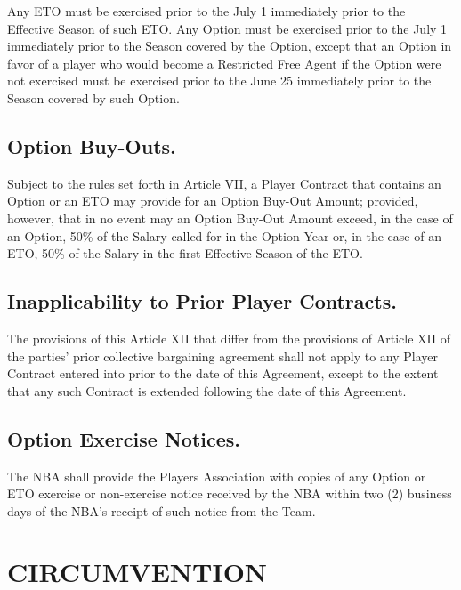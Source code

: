 \documentclass[
]{book}
\begin{document}
Any ETO must be exercised prior to the July 1 immediately prior to the Effective Season of such ETO. Any Option must be exercised prior to the July 1 immediately prior to the Season covered by the Option, except that an Option in favor of a player who would become a Restricted Free Agent if the Option were not exercised must be exercised prior to the June 25 immediately prior to the Season covered by such Option.

\hypertarget{option-buy-outs.}{%
\section{Option Buy-Outs.}\label{option-buy-outs.}}

Subject to the rules set forth in Article VII, a Player Contract that contains an Option or an ETO may provide for an Option Buy-Out Amount; provided, however, that in no event may an Option Buy-Out Amount exceed, in the case of an Option, 50\% of the Salary called for in the Option Year or, in the case of an ETO, 50\% of the Salary in the first Effective Season of the ETO.

\hypertarget{inapplicability-to-prior-player-contracts.}{%
\section{Inapplicability to Prior Player Contracts.}\label{inapplicability-to-prior-player-contracts.}}

The provisions of this Article XII that differ from the provisions of Article XII of the parties' prior collective bargaining agreement shall not apply to any Player Contract entered into prior to the date of this Agreement, except to the extent that any such Contract is extended following the date of this Agreement.

\hypertarget{option-exercise-notices.}{%
\section{Option Exercise Notices.}\label{option-exercise-notices.}}

The NBA shall provide the Players Association with copies of any Option or ETO exercise or non-exercise notice received by the NBA within two (2) business days of the NBA's receipt of such notice from the Team.

\hypertarget{circumvention}{%
\chapter{CIRCUMVENTION}\label{circumvention}}
\end{document}
